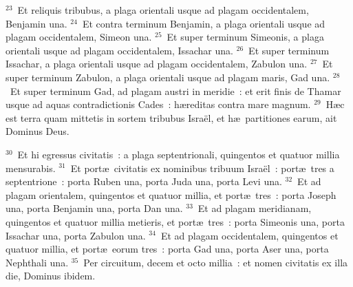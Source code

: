 ${}^{23}$~Et reliquis tribubus, a plaga orientali usque ad plagam occidentalem, Benjamin una.
${}^{24}$~Et contra terminum Benjamin, a plaga orientali usque ad plagam occidentalem, Simeon una.
${}^{25}$~Et super terminum Simeonis, a plaga orientali usque ad plagam occidentalem, Issachar una.
${}^{26}$~Et super terminum Issachar, a plaga orientali usque ad plagam occidentalem, Zabulon una.
${}^{27}$~Et super terminum Zabulon, a plaga orientali usque ad plagam maris, Gad una.
${}^{28}$~Et super terminum Gad, ad plagam austri in meridie~: et erit finis de Thamar usque ad aquas contradictionis Cades~: h\ae reditas contra mare magnum.
${}^{29}$~H\ae c est terra quam mittetis in sortem tribubus Isra\"el, et h\ae\ partitiones earum, ait Dominus Deus.


${}^{30}$~Et hi egressus civitatis~: a plaga septentrionali, quingentos et quatuor millia mensurabis.
${}^{31}$~Et port\ae\ civitatis ex nominibus tribuum Isra\"el~: port\ae\ tres a septentrione~: porta Ruben una, porta Juda una, porta Levi una.
${}^{32}$~Et ad plagam orientalem, quingentos et quatuor millia, et port\ae\ tres~: porta Joseph una, porta Benjamin una, porta Dan una.
${}^{33}$~Et ad plagam meridianam, quingentos et quatuor millia metieris, et port\ae\ tres~: porta Simeonis una, porta Issachar una, porta Zabulon una.
${}^{34}$~Et ad plagam occidentalem, quingentos et quatuor millia, et port\ae\ eorum tres~: porta Gad una, porta Aser una, porta Nephthali una.
${}^{35}$~Per circuitum, decem et octo millia~: et nomen civitatis ex illa die, Dominus ibidem.
